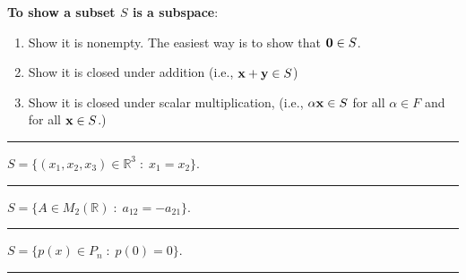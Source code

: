 \textbf{To show a subset $S$ is a subspace}:
\begin{enumerate}
	\item Show it is nonempty.  The easiest way is to show that ${\bf 0} \in S$.
	\item Show it is closed under addition (i.e., ${\bf x} + {\bf y} \in S$)
	\item Show it is closed under scalar multiplication, (i.e., $\alpha {\bf x} \in S$ for all $\alpha \in F$ and for all ${\bf x} \in S$.)
\end{enumerate}


\rule[0.01in]{\textwidth}{0.0025in}













\begin{example}
$S = \{ (x_1, x_2, x_3)  \in  \mathbb{R}^3 \; : \; x_1=x_2 \}$.
 \end{example}
	
	 
\rule[0.01in]{\textwidth}{0.0025in}






\begin{example}
$S = \{ A \in M_2(\mathbb{R}) \; : \; a_{12} = -a_{21} \}$.
 \end{example}
	
	 
\rule[0.01in]{\textwidth}{0.0025in}


 
 
 
 
 
 

\begin{example}
$S = \{ p(x) \in P_n \; : \; p(0) = 0 \}$.
 \end{example}
	
	 
\rule[0.01in]{\textwidth}{0.0025in}


 
 
 
 
 
 
